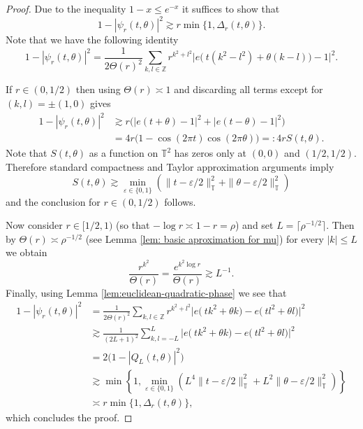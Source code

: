 \documentclass{article}
\newcommand{\Z}{\mathbb Z}
\newcommand{\T}{\mathbb T}
\theoremstyle{plain}
\numberwithin{equation}{section}
\begin{document}
\begin{proof}
    Due to the inequality $1-x \le e^{-x}$ it suffices to show that 
    \[
    1-|\psi_r(t,\theta)|^2 \gtrsim r \min\{1,\Delta_{r}(t,\theta)\}.
    \]
    Note that we have the following identity
    \begin{equation*}
        1-|\psi_r(t,\theta)|^2=\frac{1}{2\Theta(r)^2} \sum_{k,l \in \Z} r^{k^2+l^2} \big|e\big(\ t(k^2-l^2)+\theta(k-l)\big)-1 \big|^2.
    \end{equation*}
    
    If $r \in(0,1/2)$ then using $\Theta(r) \asymp 1$ and discarding all terms except for $(k,l) =\pm(1,0) $ gives 
    \begin{align*}
        1-|\psi_r(t,\theta)|^2 &\gtrsim r \Big(|e(t+\theta)-1|^2 +|e(t-\theta)-1|^2 \Big) \\
        &=4r\big(1-\cos(2\pi t) \cos(2\pi \theta) \big)=:4rS(t,\theta).
    \end{align*}
    Note that $S(t,\theta)$ as a function on $\T^2$ has zeros only at $(0,0)$ and $ (1/2,1/2)$. Therefore standard compactness and Taylor approximation arguments imply
    \[
    S(t,\theta) \gtrsim  \min_{\varepsilon \in \{0,1 \}} \left(\|t-\varepsilon/2\|_{\T}^2+ \| \theta-\varepsilon/2 \|_{\T}^2 \right)
    \]
    and the conclusion for $r \in (0,1/2)$ follows. 

    Now consider $r \in [1/2,1)$ (so that $-\log r \asymp 1-r=\rho$) and set $L=\lceil \rho^{-1/2} \rceil.$ Then by $\Theta(r) \asymp \rho^{-1/2}$ (see Lemma \ref{lem: basic aproximation for mu}) for every $|k| \le L$ we obtain
    \[
    \frac{r^{k^2}}{\Theta(r)}=\frac{e^{k^2\log r }}{\Theta(r)} \gtrsim L^{-1}.
    \]
     Finally, using Lemma \ref{lem:euclidean-quadratic-phase} we see that 
    \begin{align*}
        1-|\psi_r(t,\theta)|^2&=\frac{1}{2\Theta(r)^2} \sum_{k,l \in \Z} r^{k^2+l^2} \big|e\big(\ tk^2+\theta k\big)-e\big(\ tl^2+\theta l\big) \big|^2 \\
        &\gtrsim \frac{1}{(2L+1)^2} \sum_{k,l=-L}^L \big|e\big(\ tk^2+\theta k\big)-e\big(\ tl^2+\theta l\big) \big|^2  \\
        &=2\bigl(1-|Q_L(t,\theta)|^2\bigr) \\
        &\gtrsim \min\left\{1,
 \min_{\varepsilon\in\{0,1\}}
 \left(
 L^4\|t-\varepsilon/2\|_{\T}^2
 +L^2\|\theta-\varepsilon/2\|_{\T}^2
 \right)\right\} \\
 &\asymp r \min\{1,\Delta_{r}(t,\theta)\},
    \end{align*}
    which concludes the proof.
\end{proof}
\end{document}
